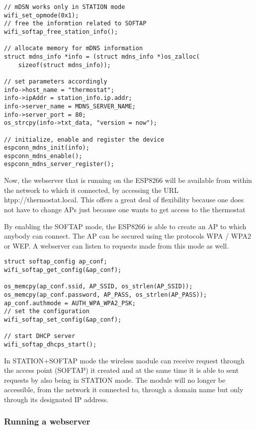 \begin{lstlisting}[frame=single]
// mDSN works only in STATION mode
wifi_set_opmode(0x1);
// free the informtion related to SOFTAP
wifi_softap_free_station_info();

// allocate memory for mDNS information
struct mdns_info *info = (struct mdns_info *)os_zalloc(
    sizeof(struct mdns_info));

// set parameters accordingly
info->host_name = "thermostat";
info->ipAddr = station_info.ip.addr;
info->server_name = MDNS_SERVER_NAME;
info->server_port = 80;
os_strcpy(info->txt_data, "version = now");

// initialize, enable and register the device
espconn_mdns_init(info);
espconn_mdns_enable();
espconn_mdns_server_register();
\end{lstlisting}

Now, the webserver that is running on the ESP8266 will be available from within the network to which it
connected, by accessing the URL htpp://thermostat.local. This offers a great deal of flexibility because one
does not have to change APs just because one wants to get access to the thermostat

By enabling the SOFTAP mode, the ESP8266 is able to create an AP to which anybody can connect. The AP can be
secured using the protocols WPA / WPA2 or WEP. A webserver can listen to requests made from this mode as well.

\begin{lstlisting}[frame=single]
struct softap_config ap_conf;
wifi_softap_get_config(&ap_conf);

os_memcpy(ap_conf.ssid, AP_SSID, os_strlen(AP_SSID));
os_memcpy(ap_conf.password, AP_PASS, os_strlen(AP_PASS));
ap_conf.authmode = AUTH_WPA_WPA2_PSK;
// set the configuration
wifi_softap_set_config(&ap_conf);

// start DHCP server
wifi_softap_dhcps_start();
\end{lstlisting}

In STATION+SOFTAP mode the wireless module can receive request through the access point (SOFTAP) it created
and at the same time it is able to sent requests by also being in STATION mode. The module will no longer be
accessible, from the network it connected to, through a domain name but only through its designated IP
address.

\subsubsection{Running a webserver}

